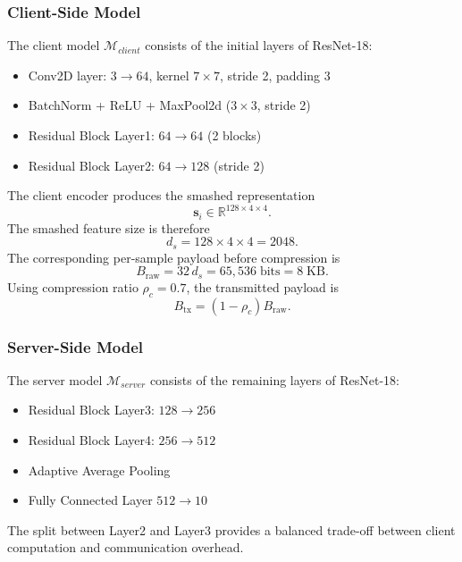 \documentclass[10pt,journal]{IEEEtran}
\begin{document}
\subsubsection{Client-Side Model}
The client model $\mathcal{M}_{client}$ consists of the initial layers of ResNet-18\cite{he2016deepresidual}:
\begin{itemize}
\item Conv2D layer: $3 \rightarrow 64$, kernel $7\times7$, stride 2, padding 3
\item BatchNorm + ReLU + MaxPool2d ($3\times3$, stride 2)
\item Residual Block Layer1: $64 \rightarrow 64$ (2 blocks)
\item Residual Block Layer2: $64 \rightarrow 128$ (stride 2)
\end{itemize}
The client encoder produces the smashed representation
\begin{equation}
\mathbf{s}_i \in \mathbb{R}^{128\times4\times4}.
\end{equation}
The smashed feature size is therefore
\begin{equation}
d_s = 128 \times 4 \times 4 = 2048.
\end{equation}
The corresponding per-sample payload before compression is
\begin{equation}
B_{\mathrm{raw}} = 32\,d_s = 65{,}536\;\text{bits} = 8\;\text{KB}.
\end{equation}
Using compression ratio $\rho_c=0.7$, the transmitted payload is
\begin{equation}
B_{\mathrm{tx}}=(1-\rho_c)B_{\mathrm{raw}}.
\end{equation}
\subsubsection{Server-Side Model}
The server model $\mathcal{M}_{server}$ consists of the remaining layers of ResNet-18\cite{he2016deepresidual}:
\begin{itemize}
\item Residual Block Layer3: $128 \rightarrow 256$
\item Residual Block Layer4: $256 \rightarrow 512$
\item Adaptive Average Pooling
\item Fully Connected Layer $512 \rightarrow 10$
\end{itemize}
The split between Layer2 and Layer3 provides a balanced trade-off between client computation and communication overhead.
\end{document}
